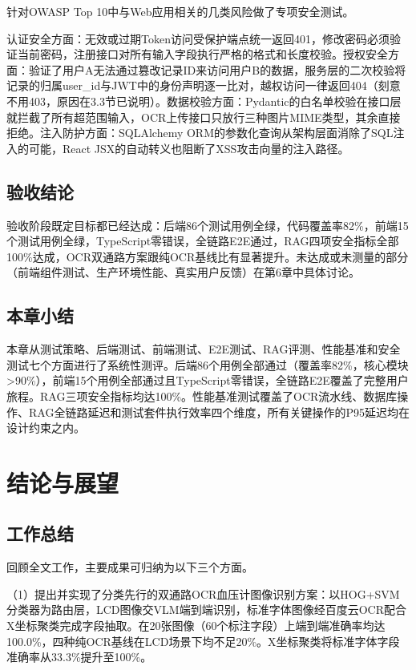 \documentclass[zihao=-4,a4paper]{ctexart}
\numberwithin{figure}{section}
\numberwithin{table}{section}
\begin{document}
针对OWASP Top 10中与Web应用相关的几类风险做了专项安全测试。

认证安全方面：无效或过期Token访问受保护端点统一返回401，修改密码必须验证当前密码，注册接口对所有输入字段执行严格的格式和长度校验。授权安全方面：验证了用户A无法通过篡改记录ID来访问用户B的数据，服务层的二次校验将记录的归属user\_id与JWT中的身份声明逐一比对，越权访问一律返回404（刻意不用403，原因在3.3节已说明）。数据校验方面：Pydantic的白名单校验在接口层就拦截了所有超范围输入，OCR上传接口只放行三种图片MIME类型，其余直接拒绝。注入防护方面：SQLAlchemy ORM的参数化查询从架构层面消除了SQL注入的可能，React JSX的自动转义也阻断了XSS攻击向量的注入路径。

\subsection{验收结论}

验收阶段既定目标都已经达成：后端86个测试用例全绿，代码覆盖率82\%，前端15个测试用例全绿，TypeScript零错误，全链路E2E通过，RAG四项安全指标全部100\%达成，OCR双通路方案跟纯OCR基线比有显著提升。未达成或未测量的部分（前端组件测试、生产环境性能、真实用户反馈）在第6章中具体讨论。

\subsection{本章小结}

本章从测试策略、后端测试、前端测试、E2E测试、RAG评测、性能基准和安全测试七个方面进行了系统性测评。后端86个用例全部通过（覆盖率82\%，核心模块>90\%），前端15个用例全部通过且TypeScript零错误，全链路E2E覆盖了完整用户旅程。RAG三项安全指标均达100\%。性能基准测试覆盖了OCR流水线、数据库操作、RAG全链路延迟和测试套件执行效率四个维度，所有关键操作的P95延迟均在设计约束之内。

\newpage
\section{结论与展望}

\subsection{工作总结}

回顾全文工作，主要成果可归纳为以下三个方面。

（1）提出并实现了分类先行的双通路OCR血压计图像识别方案：以HOG+SVM分类器为路由层，LCD图像交VLM端到端识别，标准字体图像经百度云OCR配合X坐标聚类完成字段抽取。在20张图像（60个标注字段）上端到端准确率均达100.0\%，四种纯OCR基线在LCD场景下均不足20\%。X坐标聚类将标准字体字段准确率从33.3\%提升至100\%。
\end{document}
